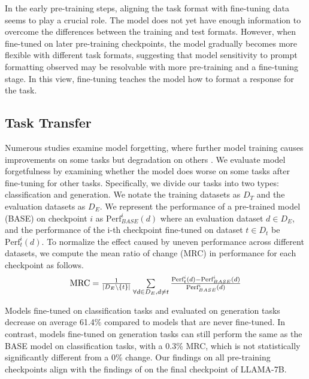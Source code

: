 In the early pre-training steps, aligning the task format with fine-tuning data seems to play a crucial role. 
The model does not yet have enough information to overcome the differences between the training and test formats.
However, when fine-tuned on later pre-training checkpoints, the model gradually becomes more flexible with different task formats, suggesting that model sensitivity to prompt formatting observed may be resolvable with more pre-training and a fine-tuning stage. In this view, fine-tuning teaches the model how to format a response for the task.


\subsection{Task Transfer}
Numerous studies examine model forgetting, where further model training causes improvements on some tasks but degradation on others \cite{mehta2023empirical}. 
We evaluate model forgetfulness by examining whether the model does worse on some tasks after fine-tuning for other tasks. 
Specifically, we divide our tasks into two types: classification and generation. 
We notate the training datasets as $D_{T}$ and the evaluation datasets as $D_{E}$. 
We represent the performance of a pre-trained model (BASE) on checkpoint $i$ as ${\text{Perf}}_{BASE}^i(d)$ where an evaluation dataset $d\in D_{E}$, and the performance of the i-th checkpoint fine-tuned on dataset $t \in D_{t}$ be $\text{Perf}_{t}^{i}(d)$. To normalize the effect caused by uneven performance across different datasets, we compute the mean ratio of change (MRC) in performance for each checkpoint as follows.
\begin{equation*}
\centering
    \resizebox{205pt}{!}{$\text{MRC} = \frac{1}{|D_{E}\setminus \{t\}|}\sum \limits_{\forall d \in D_{E}, d \neq t}{\frac{\text{Perf}_{t}^{i}(d) - {\text{Perf}}_{BASE}^i(d)}{\text{Perf}_{BASE}^i(d)}}$} 
\end{equation*}

Models fine-tuned on classification tasks and evaluated on generation tasks decrease on average 61.4\% compared to models that are never fine-tuned.
In contrast, models fine-tuned on generation tasks can still perform the same as the BASE model on classification tasks, with a 0.3\% MRC, which is not statistically significantly different from a 0\% change.
Our findings on all pre-training checkpoints align with the findings of \citet{yang2024unveiling} on the final checkpoint of LLAMA-7B.

